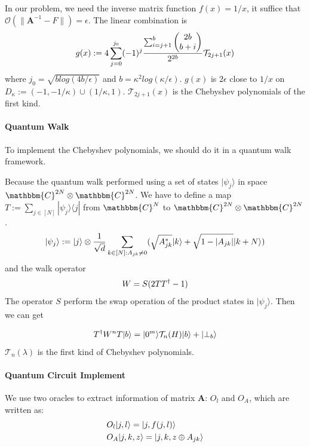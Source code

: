 \documentclass[%
 reprint,
 amsmath,amssymb,
pra,
]{revtex4-1}
\begin{document}
In our problem, we need the inverse matrix function $f(x) = 1/x$, 
it suffice that $\mathcal{O}(\lVert \bm{A}^{-1}-F\rVert)=\epsilon$.
The linear combination\cite{Childs2017Quantum} is
\begin{equation}
g(x):=4\sum_{j=0}^{j_0}(-1)^j
\frac{\sum_{i=j+1}^{b}\begin{pmatrix}
2b\\b+i
\end{pmatrix}}{2^{2b}}\mathcal{T}_{2j+1}(x)\notag
\end{equation}
where $j_0=\sqrt{b log(4b/\epsilon)}$ and $b=\kappa^2log(\kappa/\epsilon)$.
$g(x)$ is $2\epsilon$ close to $1/x$ on $D_\kappa:=(-1,-1/\kappa)\cup
(1/\kappa,1)$.
$\mathcal{T}_{2j+1}(x)$ is the Chebyshev polynomials of the first kind.
\paragraph{Quantum Walk}
To implement the Chebyshev polynomials, we should do it in a quantum walk 
framework. 

Because the quantum walk performed using a set of states $|\psi_j\rangle$
in space $\mathbbm{C}^{2N}\otimes
\mathbbm{C}^{2N}$.
We have to define a map $T:=\sum_{j\in [N]}|\psi_j\rangle\langle j|$ from
$\mathbbm{C}^{N}$ to $\mathbbm{C}^{2N}\otimes\mathbbm{C}^{2N}$.
\begin{equation}
|\psi_j\rangle:=|j\rangle\otimes \frac{1}{\sqrt{d}}
\sum_{k\in [N]:A_{jk}\neq 0}(\sqrt{A^*_{jk}}|k\rangle+\sqrt{1-|A_{jk}|}|k+N
\rangle)\notag
\end{equation}
and the walk operator
\begin{equation}
W=S(2TT^\dagger-1)\notag
\end{equation}
The operator $S$ perform the swap operation of the product states in 
$|\psi_j\rangle$. Then we can get 

\begin{equation}
T^{\dagger}W^nT|b\rangle=|0^m\rangle\mathcal{T}_n(H)|b\rangle+|\bot_b\rangle\notag
\end{equation}
$\mathcal{T}_n(\lambda)$ is the first kind of Chebyshev polynomials.

\paragraph{Quantum Circuit Implement}
We use two oracles to extract information of matrix $\bm{A}$: $O_l$ and $O_A$, which are written as:
\begin{align}
&O_l|j,l\rangle=|j,f(j,l)\rangle\notag\\
&O_A|j,k,z\rangle=|j,k,z\oplus A_{jk}\rangle\notag
\end{align}
\end{document}
